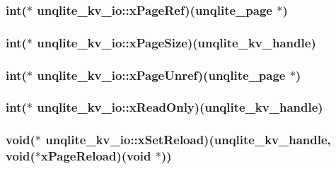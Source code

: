 \hypertarget{structunqlite__kv__io_a88b459a2fb1003978a6277aa980851d6}{
\subsubsection[{x\-Page\-Ref}]{\setlength{\rightskip}{0pt plus 5cm}int($\ast$ unqlite\-\_\-kv\-\_\-io\-::x\-Page\-Ref)({\bf unqlite\-\_\-page} $\ast$)}}\label{dd/dc2/structunqlite__kv__io_a88b459a2fb1003978a6277aa980851d6}
\hypertarget{structunqlite__kv__io_a6053dd8339051180a36131109c71abb9}{
\subsubsection[{x\-Page\-Size}]{\setlength{\rightskip}{0pt plus 5cm}int($\ast$ unqlite\-\_\-kv\-\_\-io\-::x\-Page\-Size)({\bf unqlite\-\_\-kv\-\_\-handle})}}\label{dd/dc2/structunqlite__kv__io_a6053dd8339051180a36131109c71abb9}
\hypertarget{structunqlite__kv__io_a555f0ff1c36f3b19ffd6ff947dc3b1ef}{
\subsubsection[{x\-Page\-Unref}]{\setlength{\rightskip}{0pt plus 5cm}int($\ast$ unqlite\-\_\-kv\-\_\-io\-::x\-Page\-Unref)({\bf unqlite\-\_\-page} $\ast$)}}\label{dd/dc2/structunqlite__kv__io_a555f0ff1c36f3b19ffd6ff947dc3b1ef}
\hypertarget{structunqlite__kv__io_a6a1da3115f39e303d6ecbaab307245b3}{
\subsubsection[{x\-Read\-Only}]{\setlength{\rightskip}{0pt plus 5cm}int($\ast$ unqlite\-\_\-kv\-\_\-io\-::x\-Read\-Only)({\bf unqlite\-\_\-kv\-\_\-handle})}}\label{dd/dc2/structunqlite__kv__io_a6a1da3115f39e303d6ecbaab307245b3}
\hypertarget{structunqlite__kv__io_aa5d905b2dc18db5fe2342057495573ed}{
\subsubsection[{x\-Set\-Reload}]{\setlength{\rightskip}{0pt plus 5cm}void($\ast$ unqlite\-\_\-kv\-\_\-io\-::x\-Set\-Reload)({\bf unqlite\-\_\-kv\-\_\-handle}, void($\ast$x\-Page\-Reload)(void $\ast$))}}\label{dd/dc2/structunqlite__kv__io_aa5d905b2dc18db5fe2342057495573ed}
